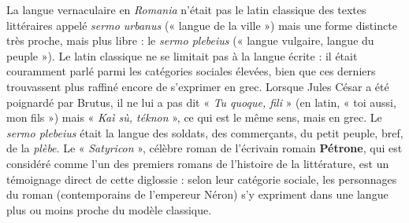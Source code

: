 La langue vernaculaire en \textit{Romania} n’était pas le latin classique des textes littéraires appelé \textit{sermo urbanus} (« langue de la ville ») mais une forme distincte très proche, mais plus libre : le \textit{sermo plebeius} (« langue vulgaire, langue du peuple »). Le latin classique ne se limitait pas à la langue écrite : il était couramment parlé parmi les catégories sociales élevées, bien que ces derniers trouvassent plus raffiné encore de s’exprimer en grec. Lorsque Jules César a été poignardé par Brutus, il ne lui a pas dit « \textit{Tu quoque, fili} » (en latin, « toi aussi, mon fils ») mais « \textit{Kaì sù, téknon} », ce qui est le même sens, mais en grec. Le \textit{sermo plebeius} était la langue des soldats, des commerçants, du petit peuple, bref, de la \textit{plèbe}. Le « \textit{Satyricon} », célèbre roman de l’écrivain romain \textbf{Pétrone}, qui est considéré comme l’un des premiers romans de l’histoire de la littérature, est un témoignage direct de cette diglossie : selon leur catégorie sociale, les personnages du roman (contemporains de l’empereur Néron) s’y expriment dans une langue plus ou moins proche du modèle classique.

